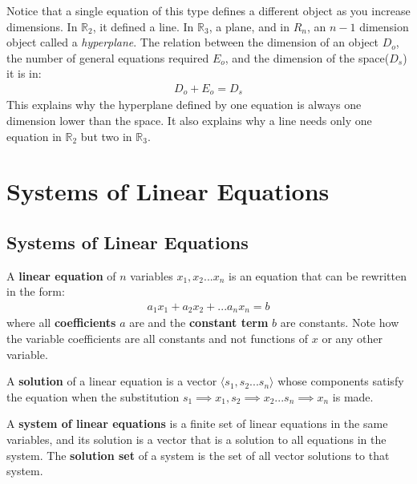 \documentclass{article}
\let\oldhat\hat
\renewcommand{\hat}[1]{\oldhat{\mathbf{#1}}}
\let\vl\langle
\let\vr\rangle
\let\ve\hat
\renewcommand{\ve}[1]{\vl#1\vr}
\begin{document}
Notice that a single equation of this type defines a different object as you increase dimensions. In $\mathbb{R}_2$, it defined a line. In $\mathbb{R}_3$, a plane, and in $R_n$, an $n-1$ dimension object called a \textit{hyperplane}. The relation between the dimension of an object $D_o$, the number of general equations required $E_o$, and the dimension of the space($D_s$) it is in:
\begin{gather*}
    D_o + E_o = D_s
\end{gather*}
This explains why the hyperplane defined by one equation is always one dimension lower than the space. It also explains why a line needs only one equation in $\mathbb{R}_2$ but two in $\mathbb{R}_3$.
\section{Systems of Linear Equations}
\subsection{Systems of Linear Equations}
A \textbf{linear equation} of $n$ variables $x_1,x_2...x_n$ is an equation that can be rewritten in the form:
\begin{gather*}
    a_1x_1 + a_2x_2 + ... a_nx_n = b
\end{gather*}
where all \textbf{coefficients} $a$ are and the \textbf{constant term} $b$ are constants. Note how the variable coefficients are all constants and not functions of $x$ or any other variable.

A \textbf{solution} of a linear equation is a vector $\ve{s_1,s_2...s_n}$ whose components satisfy the equation when the substitution $s_1 \implies x_1, s_2 \implies x_2...s_n \implies x_n$ is made.

A \textbf{system of linear equations} is a finite set of linear equations in the same variables, and its solution is a vector that is a solution to all equations in the system. The \textbf{solution set} of a system is the set of all vector solutions to that system.
\end{document}
